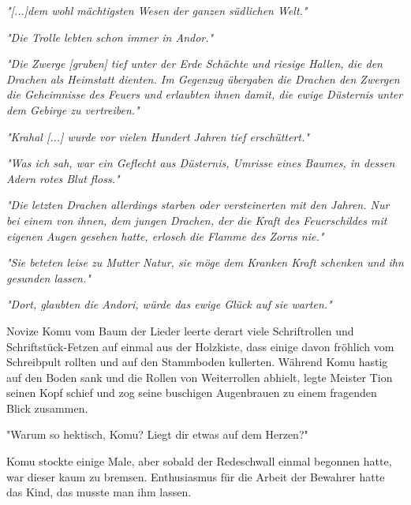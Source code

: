 \trennzeichen

\textit{"[...]dem wohl mächtigsten Wesen der ganzen südlichen Welt."}

\trennzeichen

\textit{"Die Trolle lebten schon immer in Andor."}

\trennzeichen

\textit{"Die Zwerge [gruben] tief unter der Erde Schächte und riesige Hallen, die den Drachen als Heimstatt dienten. Im Gegenzug übergaben die Drachen den Zwergen die Geheimnisse des Feuers und erlaubten ihnen damit, die ewige Düsternis unter dem Gebirge zu vertreiben."}

\trennzeichen

\textit{"Krahal [...] wurde vor vielen Hundert Jahren tief erschüttert."}

\trennzeichen

\textit{"Was ich sah, war ein Geflecht aus Düsternis, Umrisse eines Baumes, in dessen Adern rotes Blut floss."}

\trennzeichen

\textit{"Die letzten Drachen allerdings starben oder versteinerten mit den Jahren. Nur bei einem von ihnen, dem jungen Drachen, der die Kraft des Feuerschildes mit eigenen Augen gesehen hatte, erlosch die Flamme des Zorns nie."}

\trennzeichen

\textit{"Sie beteten leise zu Mutter Natur, sie möge dem Kranken Kraft schenken und ihn gesunden lassen."}

\trennzeichen

\textit{"Dort, glaubten die Andori, würde das ewige Glück auf sie warten."}



\trennzeichen



Novize Komu vom Baum der Lieder leerte derart viele Schriftrollen und Schriftstück-Fetzen auf einmal aus der Holzkiste, dass einige davon fröhlich vom Schreibpult rollten und auf den Stammboden kullerten. Während Komu hastig auf den Boden sank und die Rollen von Weiterrollen abhielt, legte Meister Tion seinen Kopf schief und zog seine buschigen Augenbrauen zu einem fragenden Blick zusammen.

"Warum so hektisch, Komu? Liegt dir etwas auf dem Herzen?"

Komu stockte einige Male, aber sobald der Redeschwall einmal begonnen hatte, war dieser kaum zu bremsen. Enthusiasmus für die Arbeit der Bewahrer hatte das Kind, das musste man ihm lassen.

